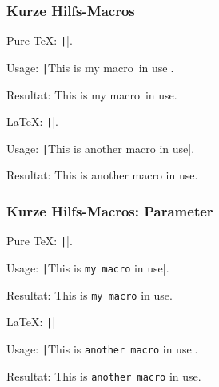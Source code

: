 \documentclass{beamer}                %
\begin{document}
\begin{frame}[fragile] %
    \frametitle{Kurze Hilfs-Macros}

    \def\mymacro{my macro}

    Pure \TeX: \texttt|\def\mymacro{my macro}|.

    Usage: \texttt|This is \mymacro\ in use|.

    Resultat: This is \mymacro\ in use.

    \newcommand\anothermacro{another macro}
    \LaTeX: \texttt|\newcommand\anothermacro{another macro}|.

    Usage: \texttt|This is \anothermacro{} in use|.

    Resultat: This is \anothermacro{} in use.
\end{frame}
\begin{frame}[fragile] %
    \frametitle{Kurze Hilfs-Macros: Parameter}

    \def\mymacro#1{\texttt{#1}}

    Pure \TeX: \texttt|\def\mymacro#1{\texttt{#1}}|.

    Usage: \texttt|This is \mymacro{my macro} in use|.

    Resultat: This is \mymacro{my macro} in use.

    \newcommand\anothermacro[1]{\texttt{#1}}
    \LaTeX: \texttt|\newcommand\anothermacro[1]{\texttt{#1}}|

    Usage: \texttt|This is \anothermacro{another macro} in use|.

    Resultat: This is \anothermacro{another macro} in use.
\end{frame}
\end{document}
